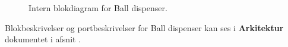 \documentclass[Rapport/Rapport_main.tex]{subfiles}
\begin{document}
\begin{figure}[H]
    \centering
    \caption{Intern blokdiagram for Ball dispenser.}
    \label{fig:rap_balldispensere_hardware_ibd}
\end{figure}

Blokbeskrivelser og portbeskrivelser for Ball dispenser kan ses i \textbf{Arkitektur} dokumentet i afsnit .
\end{document}
